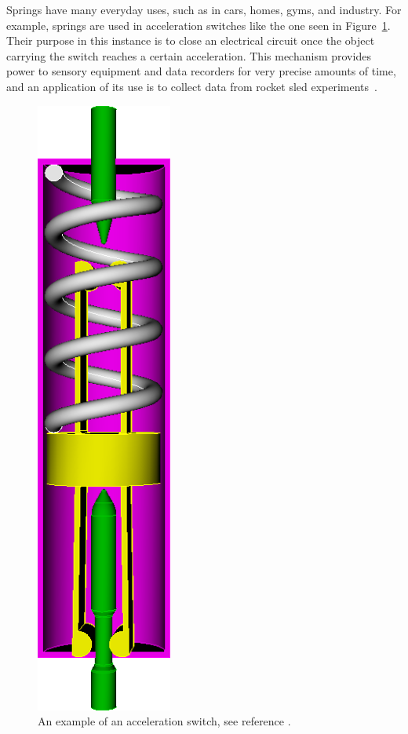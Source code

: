 \documentclass[10pt]{article}
\begin{document}
Springs have many everyday uses, such as in cars, homes, gyms, and industry. For example, springs are used in acceleration switches like the one seen in Figure~\ref{fig:Acceleration_Switch}. Their purpose in this instance is to close an electrical circuit once the object carrying the switch reaches a certain acceleration. This mechanism provides power to sensory equipment and data recorders for very precise amounts of time, and an application of its use is to collect data from rocket sled experiments~\cite{Massad2015}. 

		\begin{figure}[h]
		 \begin{center}\includegraphics[scale=.2]{Acceleration_Switch.png}\end{center}
		 \caption{An example of an acceleration switch, see reference \cite{Massad2015}.}
		 \label{fig:Acceleration_Switch}
		 
		 \end{figure}	 
		
\end{document}
